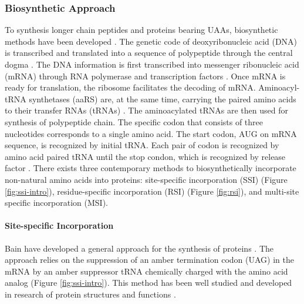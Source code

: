 \begin{refsection}
\subsubsection{Biosynthetic Approach}

To synthesis longer chain peptides and proteins bearing UAAs, biosynthetic
methods have been developed
\cite{Voloshchuk2007b,Yoo2007,Johnson2010,Link2003,Voloshchuk2010,Montclare2006b}.
The genetic code of deoxyribonucleic acid (DNA) is transcribed and translated
into a sequence of polypeptide through the central dogma \cite{CRICK1970}. The
DNA information is first transcribed into messenger ribonucleic acid (mRNA)
through RNA polymerase and transcription factors \cite{Pukkila2001}. Once mRNA
is ready for translation, the ribosome facilitates the decoding of mRNA.
Aminoacyl-tRNA synthetases (aaRS) are, at the same time, carrying the paired
amino acids to their transfer RNAs (tRNAs) \cite{Pukkila2001}. The
aminoacylated tRNAs are then used for synthesis of polypeptide chain. The
specific codon that consists of three nucleotides corresponds to a single amino
acid. The start codon, AUG on mRNA sequence, is recognized by initial tRNA.
Each pair of codon is recognized by amino acid paired tRNA \cite{Sadava2006}
until the stop condon, which is recognized by release factor
\cite{Pukkila2001}. There exists three contemporary methods to biosynthetically
incorporate non-natural amino acids into proteins: site-specific incorporation
(SSI) (Figure \ref{fig:ssi-intro}), residue-specific incorporation (RSI)
(Figure \ref{fig:rsi}), and multi-site specific incorporation (MSI). 

\paragraph{ Site-specific Incorporation}
Bain  have developed a general
approach for the  synthesis of proteins \cite{Bain1991}.  The
approach relies on the suppression of an amber termination codon (UAG) in the
mRNA by an amber suppressor tRNA chemically charged with the amino acid analog
\cite{Theato2013} (Figure \ref{fig:ssi-intro}).  This method has been well
studied and developed in research of protein structures and functions
\cite{Martoglio1995,Eichler1997}.


\end{refsection}
